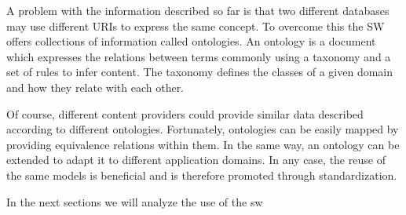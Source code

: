 

A problem with the information described so far is that two different databases may use different URIs to express the same concept.
To overcome this the SW offers collections of information called ontologies.
An ontology is a document which expresses the relations between terms commonly using a taxonomy and a set of rules to infer content.
The taxonomy defines the classes of a given domain and how they relate with each other.

Of course, different content providers could provide similar data described according to different ontologies.
Fortunately, ontologies can be easily mapped by providing equivalence relations within them.
In the same way, an ontology can be extended to adapt it to different application domains.
In any case, the reuse of the same models is beneficial and is therefore promoted through standardization.





In the next sections we will analyze the use of the \ac{sw} 